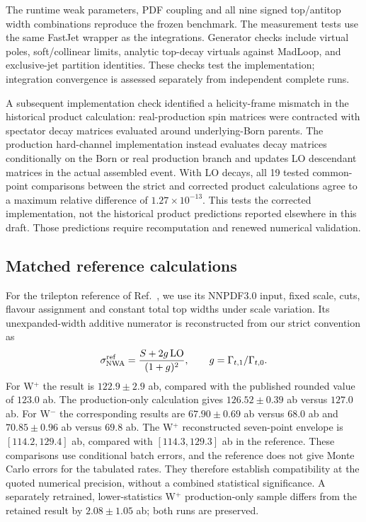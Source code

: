 The runtime weak parameters, PDF coupling and all nine signed top/antitop
width combinations reproduce the frozen benchmark. The measurement tests
use the same FastJet wrapper as the integrations. Generator checks include
virtual poles, soft/collinear limits, analytic top-decay virtuals against
MadLoop, and exclusive-jet partition identities. These checks test the
implementation; integration convergence is assessed separately from
independent complete runs.

A subsequent implementation check identified a helicity-frame mismatch in
the historical product calculation: real-production spin matrices were
contracted with spectator decay matrices evaluated around underlying-Born
parents. The production hard-channel implementation instead evaluates decay
matrices conditionally on the Born or real production branch and updates LO
descendant matrices in the actual assembled event. With LO decays, all 19
tested common-point comparisons between the strict and corrected product
calculations agree to a maximum relative difference of
$1.27\times10^{-13}$. This tests the corrected implementation, not the
historical product predictions reported elsewhere in this draft. Those
predictions require recomputation and renewed numerical validation.

\subsection{Matched reference calculations}

For the trilepton reference of Ref.~\cite{Bevilacqua2020}, we use its
NNPDF3.0 input, fixed scale, cuts, flavour assignment and constant total
top widths under scale variation. Its unexpanded-width additive numerator
is reconstructed from our strict convention as
\begin{equation}
 \sigma_{\rm NWA}^{\rm ref}=\frac{S+2g\,\mathrm{LO}}{(1+g)^2},
 \qquad g=\Gamma_{t,1}/\Gamma_{t,0}.
\end{equation}
For W$^+$ the result is $122.9\pm2.9$ ab, compared with the published
rounded value of $123.0$ ab. The production-only calculation gives
$126.52\pm0.39$ ab versus $127.0$ ab. For W$^-$ the corresponding
results are $67.90\pm0.69$ ab versus $68.0$ ab and
$70.85\pm0.96$ ab versus $69.8$ ab. The W$^+$ reconstructed seven-point
envelope is $[114.2,129.4]$ ab, compared with $[114.3,129.3]$ ab in the
reference. These comparisons use conditional batch errors, and the
reference does not give Monte Carlo errors for the tabulated rates.
They therefore establish compatibility at the quoted numerical precision,
without a combined statistical significance. A separately retrained,
lower-statistics W$^+$ production-only sample differs from the retained
result by $2.08\pm1.05$ ab; both runs are preserved.

